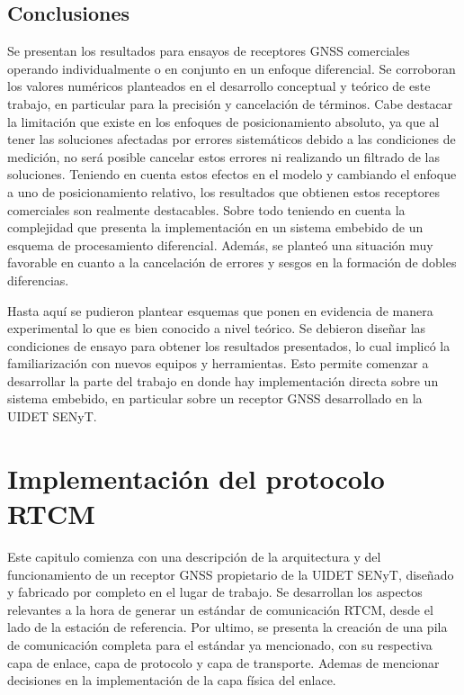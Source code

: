 \documentclass[a4paper,12pt,oneside,onecolumn,final,openright]{book}%
\begin{document}
\section{Conclusiones}
	Se presentan los resultados para ensayos de receptores GNSS comerciales operando individualmente o en conjunto en un enfoque diferencial. Se corroboran los valores numéricos planteados en el desarrollo conceptual y teórico de este trabajo, en particular para la precisión y cancelación de términos. Cabe destacar la limitación que existe en los enfoques de posicionamiento absoluto, ya que al tener las soluciones afectadas por errores sistemáticos debido a las condiciones de medición, no será posible cancelar estos errores ni realizando un filtrado de las soluciones. Teniendo en cuenta estos efectos en el modelo y cambiando el enfoque a uno de posicionamiento relativo, los resultados que obtienen estos receptores comerciales son realmente destacables. Sobre todo teniendo en cuenta la complejidad que presenta la implementación en un sistema embebido de un esquema de procesamiento diferencial. Además, se planteó una situación muy favorable en cuanto a la cancelación de errores y sesgos en la formación de dobles diferencias.
	
	Hasta aquí se pudieron plantear esquemas que ponen en evidencia de manera experimental lo que es bien conocido a nivel teórico. Se debieron diseñar las condiciones de ensayo para obtener los resultados presentados, lo cual implicó la familiarización con nuevos equipos y herramientas. Esto permite comenzar a desarrollar la parte del trabajo en donde hay implementación directa sobre un sistema embebido, en particular sobre un receptor GNSS desarrollado en la UIDET SENyT.

\chapter{Implementación del protocolo RTCM}\label{ch:Qseries}
	Este capitulo comienza con una descripción de la arquitectura y del funcionamiento de un receptor GNSS propietario de la UIDET SENyT, diseñado y fabricado por completo en el lugar de trabajo. Se desarrollan los aspectos relevantes a la hora de generar un estándar de comunicación RTCM, desde el lado de la estación de referencia. Por ultimo, se presenta la creación de una pila de comunicación completa para el estándar ya mencionado, con su respectiva capa de enlace, capa de protocolo y capa de transporte. Ademas de mencionar decisiones en la implementación de la capa física del enlace.
\end{document}
